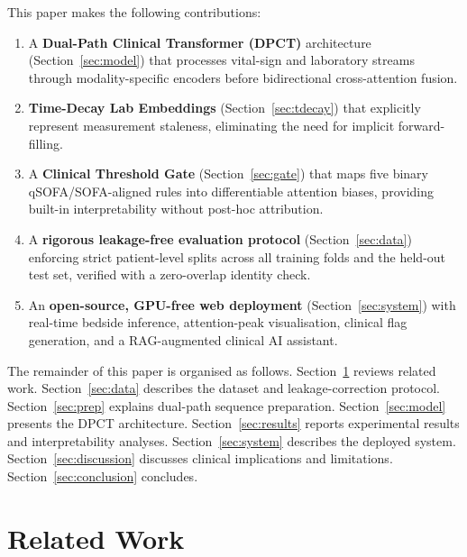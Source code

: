 \documentclass[conference,12pt]{IEEEtran}
\newcommand{\dpct}{\textsc{DPCT}}
\newcommand{\sect}[1]{Section~\ref{#1}}
\begin{document}
\medskip
This paper makes the following contributions:
\begin{enumerate}
  \item A \textbf{Dual-Path Clinical Transformer (\dpct{})} architecture
        (\sect{sec:model}) that processes vital-sign and laboratory streams
        through modality-specific encoders before bidirectional cross-attention
        fusion.

  \item \textbf{Time-Decay Lab Embeddings} (\sect{sec:tdecay}) that explicitly
        represent measurement staleness, eliminating the need for implicit
        forward-filling.

  \item A \textbf{Clinical Threshold Gate} (\sect{sec:gate}) that maps five
        binary qSOFA\slash{}SOFA-aligned rules into differentiable attention
        biases, providing built-in interpretability without post-hoc attribution.

  \item A \textbf{rigorous leakage-free evaluation protocol} (\sect{sec:data})
        enforcing strict patient-level splits across all training folds and the
        held-out test set, verified with a zero-overlap identity check.

  \item An \textbf{open-source, GPU-free web deployment} (\sect{sec:system})
        with real-time bedside inference, attention-peak visualisation,
        clinical flag generation, and a RAG-augmented clinical AI assistant.
\end{enumerate}

\medskip
The remainder of this paper is organised as follows.
\sect{sec:related} reviews related work.
\sect{sec:data} describes the dataset and leakage-correction protocol.
\sect{sec:prep} explains dual-path sequence preparation.
\sect{sec:model} presents the \dpct{} architecture.
\sect{sec:results} reports experimental results and interpretability analyses.
\sect{sec:system} describes the deployed system.
\sect{sec:discussion} discusses clinical implications and limitations.
\sect{sec:conclusion} concludes.

\section{\textbf{Related Work}}
\label{sec:related}
\end{document}
